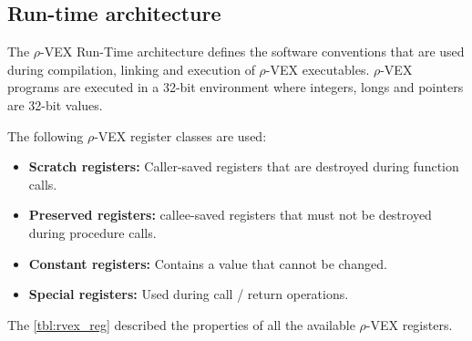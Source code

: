 \subsection{Run-time architecture}
The $\rho$-VEX Run-Time architecture defines the software conventions that are used during compilation, linking and execution of $\rho$-VEX executables. $\rho$-VEX programs are executed in a 32-bit environment where integers, longs and pointers are 32-bit values. 

The following $\rho$-VEX register classes are used:
\begin{itemize}
  \item \textbf{Scratch registers:} Caller-saved registers that are destroyed during function calls.
  \item \textbf{Preserved registers:} callee-saved registers that must not be destroyed during procedure calls.
  \item \textbf{Constant registers:} Contains a value that cannot be changed.
  \item \textbf{Special registers:} Used during call / return operations.
\end{itemize}

The \ref{tbl:rvex_reg} described the properties of all the available $\rho$-VEX registers.

